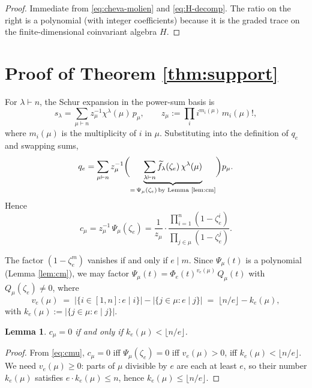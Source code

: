 \documentclass[11pt]{article}
\newtheorem{lemma}[theorem]{Lemma}
\theoremstyle{remark}
\newcommand{\ftilde}{\widetilde{f}}
\newcommand{\qe}{q_e}
\newcommand{\zetae}{\zeta_e}
\begin{document}
\begin{proof}
Immediate from \eqref{eq:cheva-molien} and \eqref{eq:H-decomp}. The ratio on the right is a polynomial (with integer coefficients) because it is the graded trace on the finite-dimensional coinvariant algebra $H$.
\end{proof}

\section{Proof of Theorem \ref{thm:support}}

For $\lambda \vdash n$, the Schur expansion in the power-sum basis is
\[
  s_\lambda = \sum_{\mu \vdash n} z_\mu^{-1} \chi^\lambda(\mu)\, p_\mu, \qquad z_\mu := \prod_i i^{m_i(\mu)}\, m_i(\mu)!,
\]
where $m_i(\mu)$ is the multiplicity of $i$ in $\mu$. Substituting into the definition of $\qe$ and swapping sums,
\[
  \qe = \sum_{\mu \vdash n} z_\mu^{-1} \biggl(\underbrace{\sum_{\lambda \vdash n} \ftilde_\lambda(\zetae)\, \chi^\lambda(\mu)}_{=\, \Psi_\mu(\zetae)\, \text{by Lemma \ref{lem:cm}}}\biggr) p_\mu.
\]
Hence
\begin{equation}\label{eq:cmu}
  c_\mu = z_\mu^{-1}\, \Psi_\mu(\zetae) = \frac{1}{z_\mu} \cdot \frac{\prod_{i=1}^n (1 - \zetae^i)}{\prod_{j \in \mu}(1 - \zetae^j)}.
\end{equation}

The factor $(1 - \zetae^m)$ vanishes if and only if $e \mid m$. Since $\Psi_\mu(t)$ is a polynomial (Lemma \ref{lem:cm}), we may factor $\Psi_\mu(t) = \Phi_e(t)^{v_e(\mu)}\, Q_\mu(t)$ with $Q_\mu(\zetae) \ne 0$, where
\begin{equation}\label{eq:vem}
  v_e(\mu) \;=\; \bigl|\{i \in [1,n] : e \mid i\}\bigr| - \bigl|\{j \in \mu : e \mid j\}\bigr| \;=\; \lfloor n/e \rfloor - k_e(\mu),
\end{equation}
with $k_e(\mu) := |\{j \in \mu : e \mid j\}|$.

\begin{lemma}\label{lem:vanish}
$c_\mu = 0$ if and only if $k_e(\mu) < \lfloor n/e \rfloor$.
\end{lemma}
\begin{proof}
From \eqref{eq:cmu}, $c_\mu = 0$ iff $\Psi_\mu(\zetae) = 0$ iff $v_e(\mu) > 0$, iff $k_e(\mu) < \lfloor n/e \rfloor$. We need $v_e(\mu) \ge 0$: parts of $\mu$ divisible by $e$ are each at least $e$, so their number $k_e(\mu)$ satisfies $e \cdot k_e(\mu) \le n$, hence $k_e(\mu) \le \lfloor n/e \rfloor$.
\end{proof}
\end{document}

